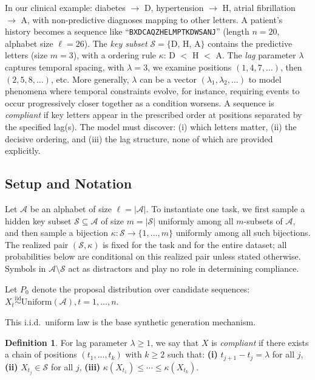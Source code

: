 \documentclass{article}
\theoremstyle{plain}
\theoremstyle{definition}
\newtheorem{definition}[theorem]{Definition}
\theoremstyle{remark}
\begin{document}
In our clinical example: diabetes $\to$ D, hypertension $\to$ H, atrial fibrillation $\to$ A, with non-predictive diagnoses mapping to other letters. A patient's history becomes a sequence like ``\texttt{BXDCAQZHELMPTKDWSANJ}'' (length $n=20$, alphabet size $\ell=26$). The \emph{key subset} $\mathcal{S} = \{$D, H, A$\}$ contains the predictive letters (size $m=3$), with a ordering rule $\kappa$: D $<$ H $<$ A. The \emph{lag} parameter $\lambda$ captures temporal spacing, with $\lambda = 3$, we examine positions $(1, 4, 7, \ldots)$, then $(2, 5, 8, \ldots)$, etc. More generally, $\lambda$ can be a vector $(\lambda_1, \lambda_2, \ldots)$ to model phenomena where temporal constraints evolve, for instance, requiring events to occur progressively closer together as a condition worsens. A sequence is \emph{compliant} if key letters appear in the prescribed order at positions separated by the specified lag(s). The model must discover: (i) which letters matter, (ii) the decisive ordering, and (iii) the lag structure, none of which are provided explicitly.

\subsection{Setup and Notation}
\label{sec:setup}

Let $\mathcal{A}$ be an alphabet of size $\ell = |\mathcal{A}|$.
To instantiate one task, we first sample a hidden key subset
$\mathcal{S} \subseteq \mathcal{A}$ of size $m = |\mathcal{S}|$
uniformly among all $m$-subsets of $\mathcal{A}$, and then sample a
bijection
$\kappa : \mathcal{S} \to \{1,\ldots,m\}$
uniformly among all such bijections. The realized pair $(\mathcal{S},\kappa)$
is fixed for the task and for the entire dataset; all probabilities below are
conditional on this realized pair unless stated otherwise. Symbols in
$\mathcal{A}\setminus\mathcal{S}$ act as distractors and play no role in
determining compliance.

Let $P_0$ denote the proposal distribution over candidate sequences:
$X_t \stackrel{\mathrm{iid}}{\sim} \mathrm{Uniform}(\mathcal{A}), t=1,\ldots,n.$

This i.i.d.\ uniform law is the base synthetic generation mechanism.

\begin{definition}
\label{def:compliance}
For lag parameter $\lambda \geq 1$, we say that $X$ is \emph{compliant}
if there exists a chain of positions $(t_1,\ldots,t_k)$ with $k\geq 2$
such that:
\textbf{(i)} $t_{j+1}-t_j=\lambda$ for all $j$,
\textbf{(ii)} $X_{t_j}\in\mathcal{S}$ for all $j$,
\textbf{(iii)} $\kappa(X_{t_1}) \leq \cdots \leq \kappa(X_{t_k})$.

\end{definition}
\end{document}
